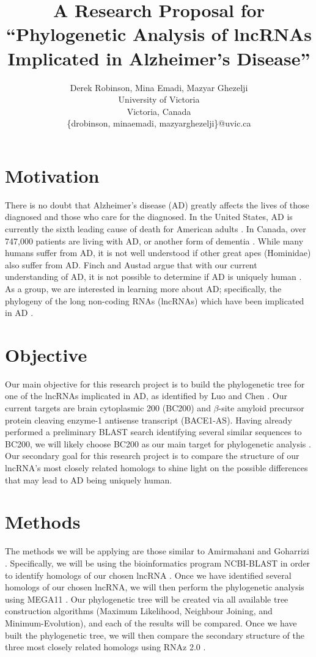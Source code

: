 \documentclass[conference]{IEEEtran}
\title{\vspace{-0.5cm}A Research Proposal for \\``Phylogenetic Analysis of lncRNAs Implicated in Alzheimer's Disease''}
\author{Derek Robinson, Mina Emadi, Mazyar Ghezelji\\
University of Victoria\\
Victoria, Canada \\
\{drobinson, minaemadi, mazyarghezelji\}@uvic.ca}
\begin{document}
\maketitle

\section{Motivation}

There is no doubt that Alzheimer's disease (AD) greatly affects the lives of those diagnosed and those who care for the diagnosed. 
In the United States, AD is currently the sixth leading cause of death for American adults \cite{AlzheimersDisease}. 
In Canada, over 747,000 patients are living with AD, or another form of dementia \cite{ADcanada}. 
While many humans suffer from AD, it is not well understood if other great apes (Hominidae) also suffer from AD. 
Finch and Austad argue that with our current understanding of AD, it is not possible to determine if AD is uniquely human \cite{finch2015commentary}.
As a group, we are interested in learning more about AD; specifically, the phylogeny of the long non-coding RNAs (lncRNAs) which have been implicated in AD \cite{luo2016long}. 

\section{Objective}

Our main objective for this research project is to build the phylogenetic tree for one of the lncRNAs implicated in AD, as identified by Luo and Chen \cite{luo2016long}. 
Our current targets are brain cytoplasmic 200 (BC200) and $\beta$-site amyloid precursor protein cleaving enzyme-1 antisense transcript (BACE1-AS). 
Having already performed a preliminary BLAST search identifying several similar sequences to BC200, we will likely choose BC200 as our main target for phylogenetic analysis \cite{madden2012blast,blastTool}. 
Our secondary goal for this research project is to compare the structure of our lncRNA's most closely related homologs to shine light on the possible differences that may lead to AD being uniquely human.

\section{Methods}

The methods we will be applying are those similar to Amirmahani and Goharrizi \cite{amirmahani2018phylogenetic}. 
Specifically, we will be using the bioinformatics program NCBI-BLAST in order to identify homologs of our chosen lncRNA \cite{madden2012blast,blastTool}. 
Once we have identified several homologs of our chosen lncRNA, we will then perform the phylogenetic analysis using MEGA11 \cite{tamura2021mega11}. 
Our phylogenetic tree will be created via all available tree construction algorithms (Maximum Likelihood, Neighbour Joining, and Minimum-Evolution), and each of the results will be compared. 
Once we have built the phylogenetic tree, we will then compare the secondary structure of the three most closely related homologs using RNAz 2.0 \cite{gruber2010rnaz}.



\end{document}
